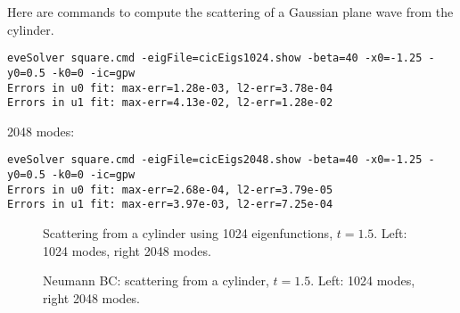 \clearpage
Here are commands to compute the scattering of a Gaussian plane wave from the cylinder.
\begin{Verbatim}[fontsize=\footnotesize]
eveSolver square.cmd -eigFile=cicEigs1024.show -beta=40 -x0=-1.25 -y0=0.5 -k0=0 -ic=gpw
Errors in u0 fit: max-err=1.28e-03, l2-err=3.78e-04
Errors in u1 fit: max-err=4.13e-02, l2-err=1.28e-02
\end{Verbatim}

2048 modes: 
\begin{Verbatim}[fontsize=\footnotesize]
eveSolver square.cmd -eigFile=cicEigs2048.show -beta=40 -x0=-1.25 -y0=0.5 -k0=0 -ic=gpw
Errors in u0 fit: max-err=2.68e-04, l2-err=3.79e-05
Errors in u1 fit: max-err=3.97e-03, l2-err=7.25e-04
\end{Verbatim}

{
\newcommand{\width}{8cm}
\begin{figure}[htb]
\begin{center}
\end{center}
\caption{Scattering from a cylinder using 1024 eigenfunctions, $t=1.5$. Left: 1024 modes, right 2048 modes.}
\label{fig:cicScattering}
\end{figure}
}


{
\newcommand{\width}{8cm}
\begin{figure}[htb]
\begin{center}
\end{center}
\caption{Neumann BC: scattering from a cylinder, $t=1.5$. Left: 1024 modes, right 2048 modes.}
\label{fig:cicScatteringNeumann}
\end{figure}
}



